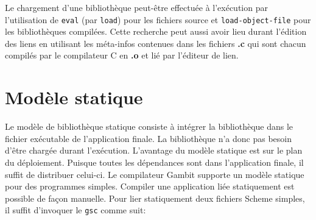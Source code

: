 Le chargement d'une bibliothèque peut-être effectuée à l'exécution par
l'utilisation de \texttt{eval} (par \texttt{load}) pour les fichiers source et
\texttt{load-object-file} pour les bibliothèques compilées. Cette recherche
peut aussi avoir lieu durant l'édition des liens en utilisant les méta-infos
contenues dans les fichiers \textbf{.c} qui sont chacun compilés par le compilateur C
en \textbf{.o} et lié par l'éditeur de lien.

\section{Modèle statique}


Le modèle de bibliothèque statique consiste à intégrer la bibliothèque dans le
fichier exécutable de l'application finale. La bibliothèque n'a donc pas besoin
d'être chargée durant l'exécution. L'avantage du modèle statique est sur le
plan du déploiement.  Puisque toutes les dépendances sont dans l'application
finale, il suffit de distribuer celui-ci. Le compilateur Gambit supporte un
modèle statique pour des programmes simples. Compiler une application liée
statiquement est possible de façon manuelle. Pour lier statiquement deux
fichiers Scheme simples, il suffit d'invoquer le \texttt{gsc} comme suit:

\begin{center}
\end{center}


